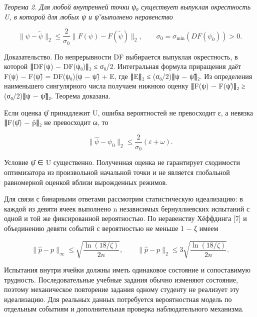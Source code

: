 \documentclass[11pt,a4paper]{article}
\begin{document}
\textit{Теорема 2. Для любой внутренней точки ψ₀ существует выпуклая окрестность U, в которой для любых ψ и ψ̃ выполнено неравенство}\par

\begin{equation}\|\psi-\widetilde\psi\|_2\le\frac{2}{\sigma_0}\|F(\psi)-F(\widetilde\psi)\|_2,\qquad \sigma_0=\sigma_{\min}(DF(\psi_0))>0.\end{equation}

Доказательство. По непрерывности DF выбирается выпуклая окрестность, в которой ∥DF(ψ) − DF(ψ₀)∥₂ ≤ σ₀/2. Интегральная формула приращения даёт F(ψ) − F(ψ̃) = DF(ψ₀)(ψ − ψ̃) + E, где ∥E∥₂ ≤ (σ₀/2)∥ψ − ψ̃∥₂. Из определения наименьшего сингулярного числа получаем нижнюю оценку ∥F(ψ) − F(ψ̃)∥₂ ≥ (σ₀/2)∥ψ − ψ̃∥₂. Теорема доказана.\par

Если оценка ψ̂ принадлежит U, ошибка вероятностей не превосходит ε, а невязка ∥F(ψ̂) − p̂∥₂ не превосходит ω, то\par

\begin{equation}\|\widehat\psi-\psi_0\|_2\le\frac{2}{\sigma_0}(\varepsilon+\omega).\end{equation}

Условие ψ̂ ∈ U существенно. Полученная оценка не гарантирует сходимости оптимизатора из произвольной начальной точки и не является глобальной равномерной оценкой вблизи вырожденных режимов.\par

Для связи с бинарными ответами рассмотрим статистическую идеализацию: в каждой из девяти ячеек выполнено n независимых бернуллиевских испытаний с одной и той же фиксированной вероятностью. По неравенству Хёффдинга [7] и объединению девяти событий с вероятностью не меньше 1 − ζ имеем\par

\begin{equation}\|\widehat p-p\|_\infty\le\sqrt{\frac{\ln(18/\zeta)}{2n}},\qquad \|\widehat p-p\|_2\le3\sqrt{\frac{\ln(18/\zeta)}{2n}}.\end{equation}

Испытания внутри ячейки должны иметь одинаковое состояние и сопоставимую трудность. Последовательные учебные задания обычно изменяют состояние, поэтому механическое повторение задания одному студенту не реализует эту идеализацию. Для реальных данных потребуется вероятностная модель по отдельным событиям и дополнительная проверка наблюдательного механизма.\par
\end{document}
